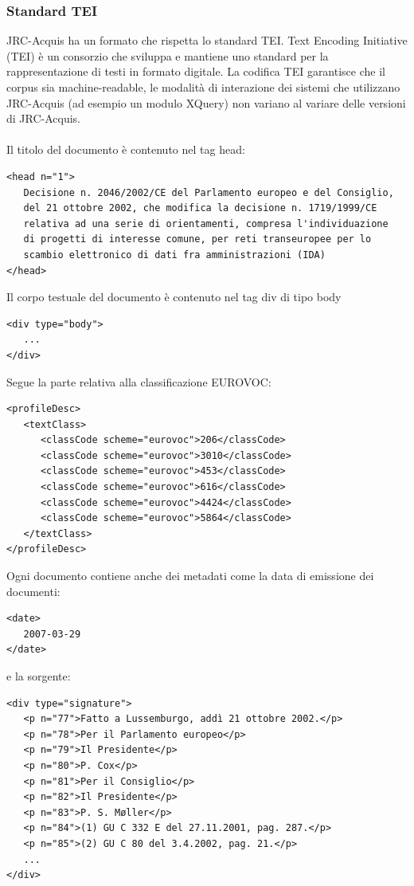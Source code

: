 \documentclass{article}
\theoremstyle{plain}
\theoremstyle{definition}
\begin{document}
\subsubsection{Standard TEI}
JRC-Acquis ha un formato che rispetta lo standard TEI.
Text Encoding Initiative (TEI) è un consorzio che sviluppa e mantiene uno standard per la rappresentazione di testi in formato digitale. La codifica TEI garantisce che il corpus sia machine-readable,  le modalità di interazione dei sistemi che utilizzano JRC-Acquis (ad esempio un modulo XQuery) non variano al variare delle versioni di JRC-Acquis.
\\
\\
Il titolo del documento è contenuto nel tag head:
\begin{verbatim}
<head n="1"> 
   Decisione n. 2046/2002/CE del Parlamento europeo e del Consiglio,
   del 21 ottobre 2002, che modifica la decisione n. 1719/1999/CE
   relativa ad una serie di orientamenti, compresa l'individuazione 
   di progetti di interesse comune, per reti transeuropee per lo 
   scambio elettronico di dati fra amministrazioni (IDA)
</head>
\end{verbatim}
Il corpo testuale del documento è contenuto nel tag div di tipo body
\begin{verbatim}
<div type="body">
   ...
</div>
\end{verbatim}
Segue la parte relativa alla classificazione EUROVOC:
\begin{verbatim}
<profileDesc>
   <textClass>
      <classCode scheme="eurovoc">206</classCode>
      <classCode scheme="eurovoc">3010</classCode>
      <classCode scheme="eurovoc">453</classCode>
      <classCode scheme="eurovoc">616</classCode>
      <classCode scheme="eurovoc">4424</classCode>
      <classCode scheme="eurovoc">5864</classCode>
   </textClass>
</profileDesc>
\end{verbatim}
Ogni documento contiene anche dei metadati come la data di emissione dei documenti:
\begin{verbatim}
<date>
   2007-03-29
</date>
\end{verbatim}
e la sorgente:
\begin{verbatim}
<div type="signature">
   <p n="77">Fatto a Lussemburgo, addì 21 ottobre 2002.</p>
   <p n="78">Per il Parlamento europeo</p>
   <p n="79">Il Presidente</p>
   <p n="80">P. Cox</p>
   <p n="81">Per il Consiglio</p>
   <p n="82">Il Presidente</p>
   <p n="83">P. S. Møller</p>
   <p n="84">(1) GU C 332 E del 27.11.2001, pag. 287.</p>
   <p n="85">(2) GU C 80 del 3.4.2002, pag. 21.</p>
   ... 
</div>
\end{verbatim}
\end{document}
